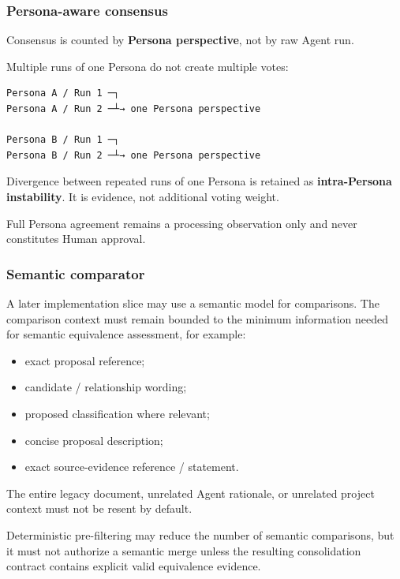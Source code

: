 \hypertarget{persona-aware-consensus}{%
\subsubsection{Persona-aware consensus}\label{persona-aware-consensus}}

Consensus is counted by \textbf{Persona perspective}, not by raw Agent run.

Multiple runs of one Persona do not create multiple votes:

\begin{verbatim}
Persona A / Run 1 ─┐
Persona A / Run 2 ─┴→ one Persona perspective

Persona B / Run 1 ─┐
Persona B / Run 2 ─┴→ one Persona perspective
\end{verbatim}

Divergence between repeated runs of one Persona is retained as \textbf{intra-Persona instability}. It is evidence, not additional voting weight.

Full Persona agreement remains a processing observation only and never constitutes Human approval.

\hypertarget{semantic-comparator}{%
\subsubsection{Semantic comparator}\label{semantic-comparator}}

A later implementation slice may use a semantic model for comparisons. The comparison context must remain bounded to the minimum information needed for semantic equivalence assessment, for example:

\begin{itemize}
\tightlist
\item
  exact proposal reference;
\item
  candidate / relationship wording;
\item
  proposed classification where relevant;
\item
  concise proposal description;
\item
  exact source-evidence reference / statement.
\end{itemize}

The entire legacy document, unrelated Agent rationale, or unrelated project context must not be resent by default.

Deterministic pre-filtering may reduce the number of semantic comparisons, but it must not authorize a semantic merge unless the resulting consolidation contract contains explicit valid equivalence evidence.

